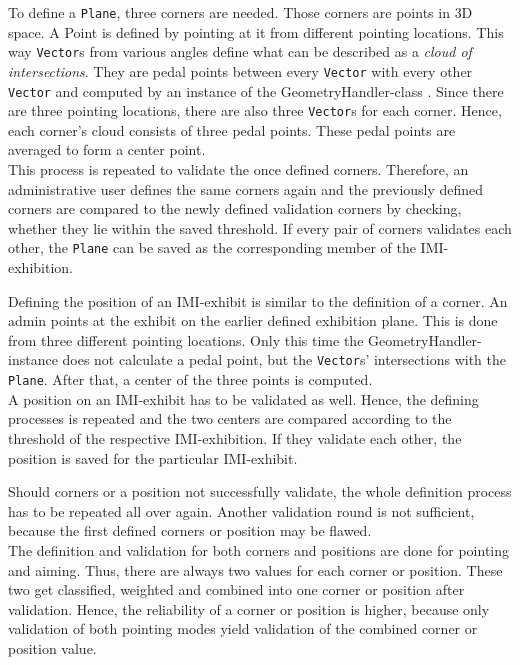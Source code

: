 To define a \texttt{Plane}, three corners are needed. Those corners are points in \ac{3D} space. A Point is defined by pointing at it from different pointing locations. This way \texttt{Vector}s from various angles define what can be described as a \textit{cloud of intersections}. They are pedal points between every \texttt{Vector} with every other \texttt{Vector} and computed by an instance of the GeometryHandler-class . Since there are three pointing locations, there are also three \texttt{Vector}s for each corner. Hence, each corner's cloud consists of three pedal points. These pedal points are averaged to form a center point.
\\
This process is repeated to validate the once defined corners. Therefore, an administrative user defines the same corners again and the previously defined corners are compared to the newly defined validation corners by checking, whether they lie within the saved threshold. If every pair of corners validates each other, the \texttt{Plane} can be saved as the corresponding member of the \ac{IMI}-exhibition.

Defining the position of an \ac{IMI}-exhibit is similar to the definition of a corner. An admin points at the exhibit on the earlier defined exhibition plane. This is done from three different pointing locations. Only this time the GeometryHandler-instance does not calculate a pedal point, but the \texttt{Vector}s' intersections with the \texttt{Plane}. After that, a center of the three points is computed.
\\
A position on an \ac{IMI}-exhibit has to be validated as well. Hence, the defining processes is repeated and the two centers are compared according to the threshold of the respective \ac{IMI}-exhibition. If they validate each other, the position is saved for the particular \ac{IMI}-exhibit. 

Should corners or a position not successfully validate, the whole definition process has to be repeated all over again. Another validation round is not sufficient, because the first defined corners or position may be flawed.
\\
The definition and validation for both corners and positions are done for pointing and aiming. Thus, there are always two values for each corner or position. These two get classified, weighted and combined into one corner or position after validation. Hence, the reliability of a corner or position is higher, because only validation of both pointing modes yield validation of the combined corner or position value.

